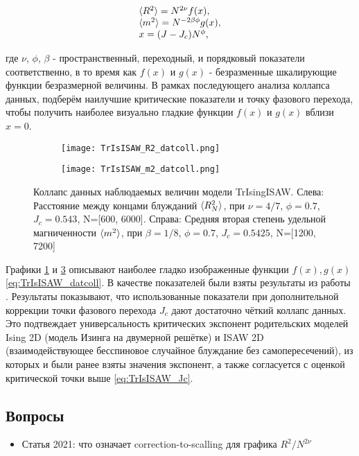 \begin{equation}
\begin{array}{l}
\label{eq:TrIsISAW_datcoll}
\langle R^2 \rangle = N^{2\nu} f(x), \\
\langle m^2 \rangle = N^{-2\beta\phi} g(x), \\
x = (J-J_c) N^{\phi},
\end{array}
\end{equation}

где $\nu$, $\phi$, $\beta$  - пространственный, переходный, и порядковый показатели соответственно, в то время как $f(x)$ и $g(x)$ - безразменные шкалирующие функции безразмерной величины.
В рамках последующего анализа коллапса данных, подберём наилучшие критические показатели и точку фазового перехода, 
чтобы получить наиболее визуально гладкие функции $f(x)$ и $g(x)$ вблизи $x=0$.


\begin{figure}[h]
\begin{subfigure}{0.49\textwidth}
\texttt{[image: TrIsISAW\_R2\_datcoll.png]}
\caption{}
\label{fig:TrIsISAW_R2_datcoll}
\end{subfigure}
\hfill
\begin{subfigure}{0.49\textwidth}
\texttt{[image: TrIsISAW\_m2\_datcoll.png]}
\caption{}
\label{fig:TrIsISAW_m2_datcoll}
\end{subfigure}
\caption{Коллапс данных наблюдаемых величин модели TrIsingISAW.
Слева: Расстояние между концами блужданий $\langle R^2_N \rangle$, при $\nu = 4/7$, $\phi=0.7$, $J_c = 0.543$, N=[600, 6000].
Справа: Средняя вторая степень удельной магниченности $\langle m^2 \rangle$, при $\beta = 1/8$, $\phi=0.7$, $J_c = 0.5425$, N=[1200, 7200]}
\end{figure}

Графики \ref{fig:TrIsISAW_R2_datcoll} и \ref{fig:TrIsISAW_m2_datcoll} описывают наиболее гладко изображенные функции $f(x), g(x)$ \eqref{eq:TrIsISAW_datcoll}.
В качестве показателей были взяты результаты из работы \cite{faizullina2021critical}.
Результаты показывают, что использованные показатели при дополнительной коррекции точки фазового перехода $J_c$ дают достаточно чёткий коллапс данных.
Это подтвеждает универсальность критических экспонент родительских моделей Ising 2D (модель Изинга на двумерной решётке) 
и ISAW 2D (взаимодействующее бесспиновое случайное блуждание без самопересечений), из которых и были ранее взяты значения экспонент,
а также согласуется с оценкой критической точки выше \eqref{eq:TrIsISAW_Jc}.


\subsection{Вопросы}

\begin{itemize}
\item Статья 2021: что означает correction-to-scalling для графика $R^2 / N^{2\nu}$
\end{itemize}

